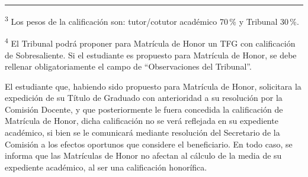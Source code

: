 \documentclass[12pt,a4paper,oneside]{article}
\begin{document}
\vfill
\noindent\rule{0.3\linewidth}{0.4pt}\par
{\fontsize{7.5}{9}\selectfont
\noindent\textsuperscript{3} Los pesos de la calificación son: tutor/cotutor académico 70\,\% y Tribunal 30\,\%.\par\smallskip
\noindent\textsuperscript{4} El Tribunal podrá proponer para Matrícula de Honor un TFG con calificación de Sobresaliente. Si el estudiante es propuesto para Matrícula de Honor, se debe rellenar obligatoriamente el campo de ``Observaciones del Tribunal''.\par
El estudiante que, habiendo sido propuesto para Matrícula de Honor, solicitara la expedición de su Título de Graduado con anterioridad a su resolución por la Comisión Docente, y que posteriormente le fuera concedida la calificación de Matrícula de Honor, dicha calificación no se verá reflejada en su expediente académico, si bien se le comunicará mediante resolución del Secretario de la Comisión a los efectos oportunos que considere el beneficiario. En todo caso, se informa que las Matrículas de Honor no afectan al cálculo de la media de su expediente académico, al ser una calificación honorífica.\par}

\clearpage
\noindent{}
\clearpage


\end{document}

